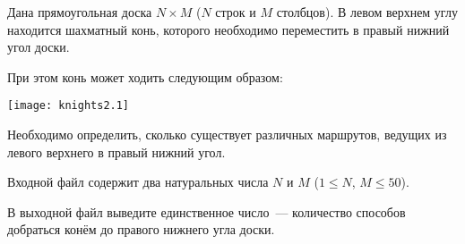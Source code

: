 

Дана прямоугольная доска $N \times M$ ($N$ строк и $M$ столбцов). В левом верхнем углу находится шахматный конь, которого необходимо переместить в правый нижний угол доски.

При этом конь может ходить следующим образом:

\centerline{\texttt{[image: knights2.1]}}

Необходимо определить, сколько существует различных маршрутов, ведущих из левого верхнего в правый нижний угол.

\InputFile
Входной файл содержит два натуральных числа $N$ и $M$ ($1 \leqslant N$, $M \leqslant 50$).


\OutputFile
В выходной файл выведите единственное число~--- количество способов добраться конём до правого нижнего угла доски.

